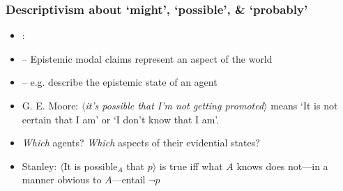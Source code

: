 \begin{frame}
\frametitle{Descriptivism about `might', `possible', \& `probably'}

\begin{itemize}[<+->]

\item {}:

\item[] -- Epistemic modal claims represent an aspect of the world

\item[] -- e.g. describe the epistemic state of an agent

\item G. E. Moore: $\langle$\textit{it's possible that I'm not getting promoted}$\rangle$ means `It is not certain that I am' or `I don't know that I am'. 


\item \textit{Which} agents? \textit{Which} aspects of their evidential states?

\item Stanley: $\langle$It is possible$_A$ that $p$$\rangle$ is true iff what $A$ knows does not---in a manner obvious to $A$---entail $\neg p$


\end{itemize}
\end{frame}

